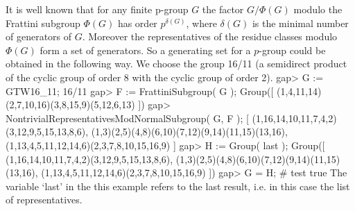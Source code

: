 

        It is well known that for any finite p-group $G$ the factor $G/\Phi(G)$
        modulo the Frattini subgroup $\Phi(G)$ has order $p^{\delta(G)}$, where
        $\delta(G)$ is the minimal number of generators of $G$. Moreover
        the representatives of the residue classes modulo $\Phi(G)$ form a
        set of generators. So a generating set for a $p$-group
        could  be obtained in the following way. We choose the group 16/11 (a
        semidirect product of the cyclic group of order 8 with the cyclic
        group of order 2).
\beginexample
    gap> G := GTW16_11;
    16/11
    gap> F := FrattiniSubgroup( G );
    Group([ (1,4,11,14)(2,7,10,16)(3,8,15,9)(5,12,6,13) ])
    gap> NontrivialRepresentativesModNormalSubgroup( G, F );
    [ (1,16,14,10,11,7,4,2)(3,12,9,5,15,13,8,6),
      (1,3)(2,5)(4,8)(6,10)(7,12)(9,14)(11,15)(13,16),
      (1,13,4,5,11,12,14,6)(2,3,7,8,10,15,16,9) ]
    gap> H := Group( last );
    Group([ (1,16,14,10,11,7,4,2)(3,12,9,5,15,13,8,6),
      (1,3)(2,5)(4,8)(6,10)(7,12)(9,14)(11,15)(13,16),
      (1,13,4,5,11,12,14,6)(2,3,7,8,10,15,16,9) ])
    gap> G = H;  # test
    true
\endexample
        The variable `last' in the this example refers to the last result,
        i.e. in this case the list of representatives.

